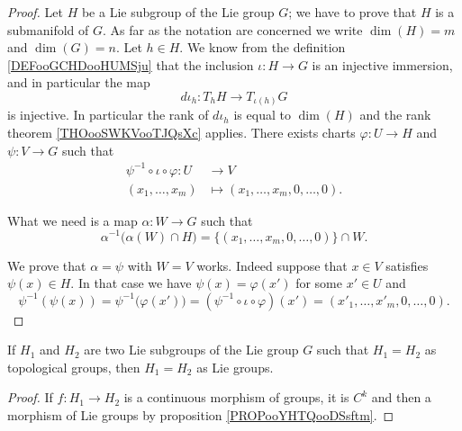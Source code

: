 \begin{proof}
	Let \( H\) be a Lie subgroup of the Lie group \( G\); we have to prove that \( H\) is a submanifold of \( G\). As far as the notation are concerned we write \( \dim(H)=m\) and \( \dim(G)=n\). Let \( h\in H\). We know from the definition \ref{DEFooGCHDooHUMSju} that the inclusion \( \iota\colon H\to G\) is an injective immersion, and in particular the map
	\begin{equation}
		d\iota_h\colon T_hH\to T_{\iota(h)}G
	\end{equation}
	is injective. In particular the rank of \( d\iota_h\) is equal to \( \dim(H)\) and the rank theorem \ref{THOooSWKVooTJQsXc} applies. There exists charts \( \varphi\colon U\to H\) and \( \psi\colon V\to G\) such that
	\begin{equation}
		\begin{aligned}
			\psi^{-1}\circ\iota\circ\varphi\colon U & \to V                                  \\
			(x_1,\ldots, x_m)                       & \mapsto (x_1,\ldots, x_m,0,\ldots, 0).
		\end{aligned}
	\end{equation}

	What we need is a map \( \alpha\colon W\to G\) such that
	\begin{equation}
		\alpha^{-1}\big( \alpha(W)\cap H \big)=\{ (x_1,\ldots, x_m,0,\ldots, 0) \}\cap W.
	\end{equation}

	We prove that \( \alpha=\psi\) with \( W=V\) works. Indeed suppose that \( x\in V\) satisfies \( \psi(x)\in H\). In that case we have \( \psi(x)=\varphi(x')\) for some \( x'\in U\) and
	\begin{equation}
		\psi^{-1}(\psi(x))=\psi^{-1}\big( \varphi(x') \big)=(\psi^{-1}\circ\iota\circ\varphi)(x')=(x'_1,\ldots, x'_m,0,\ldots, 0).
	\end{equation}
\end{proof}

\begin{corollary} \label{CORooMCWWooXkpkNO}
	If $H_1$ and $H_2$ are two Lie subgroups of the Lie group $G$  such that $H_1=H_2$ as topological groups, then $H_1=H_2$ as Lie groups.
\end{corollary}

\begin{proof}
	If \(f \colon H_1\to H_2  \) is a continuous morphism of groups, it is \( C^k\) and then a morphism of Lie groups by proposition \ref{PROPooYHTQooDSsftm}.
\end{proof}


